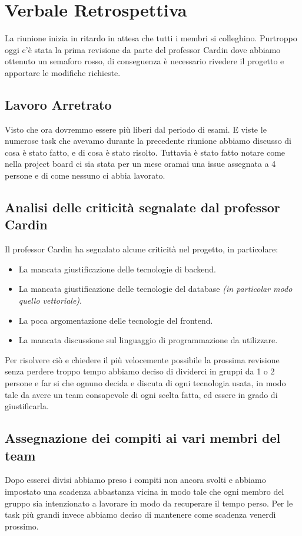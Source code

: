 \documentclass{article}
\begin{document}
\section{Verbale Retrospettiva}
La riunione inizia in ritardo in attesa che tutti i membri si colleghino. Purtroppo oggi c'è stata la prima revisione da parte del professor Cardin dove abbiamo ottenuto un semaforo rosso, di conseguenza è necessario rivedere il progetto e apportare le modifiche richieste.
\subsection{Lavoro Arretrato}
Visto che ora dovremmo essere più liberi dal periodo di esami. E viste le numerose task che avevamo durante la precedente riunione abbiamo discusso di cosa è stato fatto, e di cosa è stato risolto. Tuttavia è stato fatto notare come nella project board ci sia stata per un mese oramai una issue assegnata a 4 persone e di come nessuno ci abbia lavorato.
\subsection{Analisi delle criticità segnalate dal professor Cardin}
Il professor Cardin ha segnalato alcune criticità nel progetto, in particolare:
\begin{itemize}
    \item La mancata giustificazione delle tecnologie di backend.
    \item La mancata giustificazione delle tecnologie del database \textit{(in particolar modo quello vettoriale)}.
    \item La poca argomentazione delle tecnologie del frontend.
    \item La mancata discussione sul linguaggio di programmazione da utilizzare.
\end{itemize}
Per risolvere ciò e chiedere il più velocemente possibile la prossima revisione senza perdere troppo tempo abbiamo deciso di dividerci in gruppi da 1 o 2 persone e far si che ognuno decida e discuta di ogni tecnologia usata, in modo tale da avere un team consapevole di ogni scelta fatta, ed essere in grado di giustificarla.
\subsection{Assegnazione dei compiti ai vari membri del team}
Dopo esserci divisi abbiamo preso i compiti non ancora svolti e abbiamo impostato una scadenza abbastanza vicina in modo tale che ogni membro del gruppo sia intenzionato a lavorare in modo da recuperare il tempo perso. Per le task più grandi invece abbiamo deciso di mantenere come scadenza venerdì prossimo.
\end{document}
